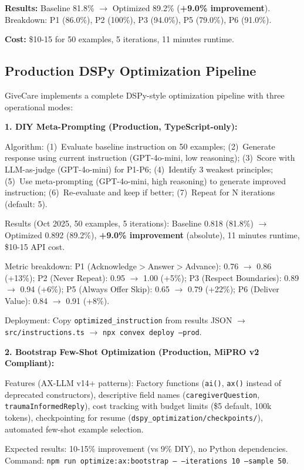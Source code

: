 \documentclass{article}
\begin{document}
\textbf{Results:} Baseline 81.8\% $\rightarrow$ Optimized 89.2\% (\textbf{+9.0\% improvement}). Breakdown: P1 (86.0\%), P2 (100\%), P3 (94.0\%), P5 (79.0\%), P6 (91.0\%).

\textbf{Cost:} \$10-15 for 50 examples, 5 iterations, 11 minutes runtime.

%
\subsection{Production DSPy Optimization Pipeline}%
\label{subsec:ProductionDSPyOptimizationPipeline}%
GiveCare implements a complete DSPy-style optimization pipeline with three operational modes:

\textbf{1. DIY Meta-Prompting (Production, TypeScript-only):}

Algorithm: (1)~Evaluate baseline instruction on 50 examples; (2)~Generate response using current instruction (GPT-4o-mini, low reasoning); (3)~Score with LLM-as-judge (GPT-4o-mini) for P1-P6; (4)~Identify 3 weakest principles; (5)~Use meta-prompting (GPT-4o-mini, high reasoning) to generate improved instruction; (6)~Re-evaluate and keep if better; (7)~Repeat for N iterations (default: 5).

Results (Oct 2025, 50 examples, 5 iterations): Baseline 0.818 (81.8\%) $\rightarrow$ Optimized 0.892 (89.2\%), \textbf{+9.0\% improvement} (absolute), 11 minutes runtime, \$10-15 API cost.

Metric breakdown: P1 (Acknowledge$>$Answer$>$Advance): 0.76 $\rightarrow$ 0.86 (+13\%); P2 (Never Repeat): 0.95 $\rightarrow$ 1.00 (+5\%); P3 (Respect Boundaries): 0.89 $\rightarrow$ 0.94 (+6\%); P5 (Always Offer Skip): 0.65 $\rightarrow$ 0.79 (+22\%); P6 (Deliver Value): 0.84 $\rightarrow$ 0.91 (+8\%).

Deployment: Copy \texttt{optimized\_instruction} from results JSON $\rightarrow$ \texttt{src/instructions.ts} $\rightarrow$ \texttt{npx convex deploy --prod}.

\textbf{2. Bootstrap Few-Shot Optimization (Production, MiPRO v2 Compliant):}

Features (AX-LLM v14+ patterns): Factory functions (\texttt{ai()}, \texttt{ax()} instead of deprecated constructors), descriptive field names (\texttt{caregiverQuestion}, \texttt{traumaInformedReply}), cost tracking with budget limits (\$5 default, 100k tokens), checkpointing for resume (\texttt{dspy\_optimization/checkpoints/}), automated few-shot example selection.

Expected results: 10-15\% improvement (vs 9\% DIY), no Python dependencies. Command: \texttt{npm run optimize:ax:bootstrap -- --iterations 10 --sample 50}.
\end{document}

